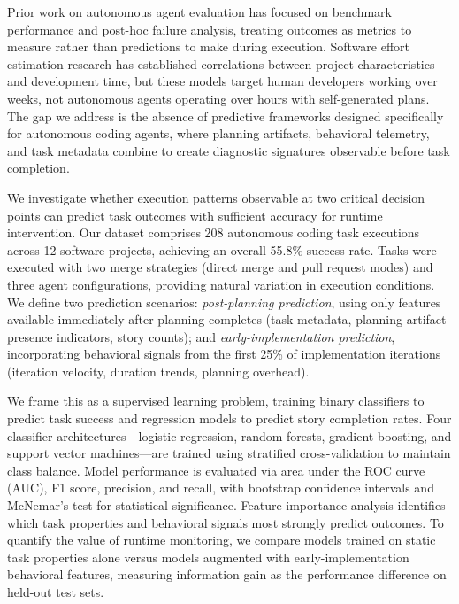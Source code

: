 \documentclass[]{article}
\begin{document}
Prior work on autonomous agent evaluation has focused on benchmark performance and post-hoc failure analysis, treating outcomes as metrics to measure rather than predictions to make during execution. Software effort estimation research has established correlations between project characteristics and development time, but these models target human developers working over weeks, not autonomous agents operating over hours with self-generated plans. The gap we address is the absence of predictive frameworks designed specifically for autonomous coding agents, where planning artifacts, behavioral telemetry, and task metadata combine to create diagnostic signatures observable before task completion.

We investigate whether execution patterns observable at two critical decision points can predict task outcomes with sufficient accuracy for runtime intervention. Our dataset comprises 208 autonomous coding task executions across 12 software projects, achieving an overall 55.8\% success rate. Tasks were executed with two merge strategies (direct merge and pull request modes) and three agent configurations, providing natural variation in execution conditions. We define two prediction scenarios: \textit{post-planning prediction}, using only features available immediately after planning completes (task metadata, planning artifact presence indicators, story counts); and \textit{early-implementation prediction}, incorporating behavioral signals from the first 25\% of implementation iterations (iteration velocity, duration trends, planning overhead).

We frame this as a supervised learning problem, training binary classifiers to predict task success and regression models to predict story completion rates. Four classifier architectures—logistic regression, random forests, gradient boosting, and support vector machines—are trained using stratified cross-validation to maintain class balance. Model performance is evaluated via area under the ROC curve (AUC), F1 score, precision, and recall, with bootstrap confidence intervals and McNemar's test for statistical significance. Feature importance analysis identifies which task properties and behavioral signals most strongly predict outcomes. To quantify the value of runtime monitoring, we compare models trained on static task properties alone versus models augmented with early-implementation behavioral features, measuring information gain as the performance difference on held-out test sets.
\end{document}
